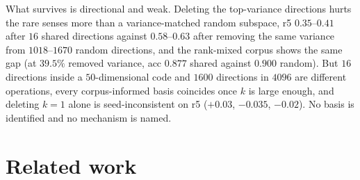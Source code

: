 \documentclass{article}
\begin{document}
What survives is directional and weak. Deleting the top-variance directions hurts
the rare senses more than a variance-matched random subspace, r5 $0.35$--$0.41$
after $16$ shared directions against $0.58$--$0.63$ after removing the same
variance from $1018$--$1670$ random directions, and the rank-mixed corpus shows the
same gap (at $39.5\%$ removed variance, acc $0.877$ shared against $0.900$
random). But $16$ directions inside a $50$-dimensional code and $1600$ directions
in $4096$ are different operations, every corpus-informed basis coincides once $k$
is large enough, and deleting $k{=}1$ alone is seed-inconsistent on r5 ($+0.03$,
$-0.035$, $-0.02$). No basis is identified and no mechanism is named.

\section{Related work}
\end{document}
